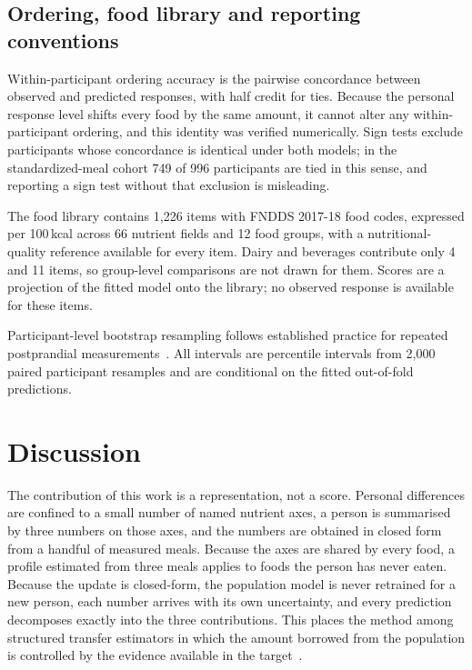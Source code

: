 \documentclass[pdflatex,sn-nature]{sn-jnl}
\theoremstyle{thmstyleone}
\theoremstyle{thmstyletwo}
\theoremstyle{thmstylethree}
\begin{document}
\subsection{Ordering, food library and reporting conventions}

Within-participant ordering accuracy is the pairwise concordance between observed and predicted
responses, with half credit for ties. Because the personal response level shifts every food by the
same amount, it cannot alter any within-participant ordering, and this identity was verified
numerically. Sign tests exclude participants whose concordance is identical under both models; in
the standardized-meal cohort 749 of 996 participants are tied in this sense, and reporting a sign
test without that exclusion is misleading.

The food library contains 1,226 items with FNDDS 2017-18 food codes, expressed per 100\,kcal
across 66 nutrient fields and 12 food groups, with a nutritional-quality reference available for
every item. Dairy and beverages contribute only 4 and 11 items, so group-level comparisons are not
drawn for them. Scores are a projection of the fitted model onto the library; no observed response
is available for these items.

Participant-level bootstrap resampling follows established practice for repeated postprandial
measurements~\cite{aegis2026}. All intervals are percentile intervals from 2,000 paired
participant resamples and are conditional on the fitted out-of-fold predictions.

\section{Discussion}\label{sec12}

The contribution of this work is a representation, not a score. Personal differences are confined to a small number of named nutrient axes, a person is summarised by three numbers on those axes, and the numbers are obtained in closed form from a handful of measured meals. Because the axes are shared by every food, a profile estimated from three meals applies to foods the person has never eaten. Because the update is closed-form, the population model is never retrained for a new person, each number arrives with its own uncertainty, and every prediction decomposes exactly into the three contributions. This places the method among structured transfer estimators in which the amount borrowed from the population is controlled by the evidence available in the target~\cite{dvcm2026,contextadaptive2026}.
\end{document}
